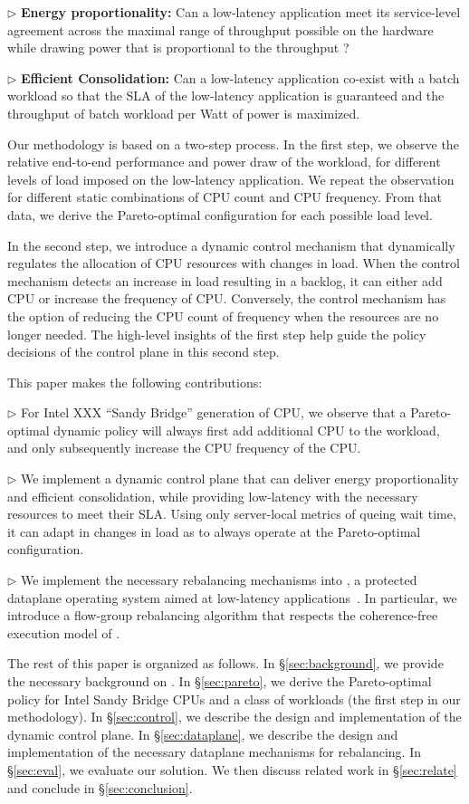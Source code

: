 $\triangleright$ {\bf Energy proportionality:} Can a low-latency
application meet its service-level agreement across the maximal range
of throughput possible on the hardware while drawing power that is
proportional to the throughput ? 

$\triangleright$ {\bf Efficient Consolidation:} Can a low-latency application
co-exist with a batch workload so that the SLA of the low-latency
application is guaranteed and the throughput of batch workload per
Watt of power is maximized.

Our methodology is based on a two-step process.  In the first step, we
observe the relative end-to-end performance and power draw of the
workload, for different levels of load imposed on the low-latency
application.  We repeat the observation for different static
combinations of CPU count and CPU frequency.  From that data, we
derive the Pareto-optimal configuration for each possible load level.

In the second step, we introduce a dynamic control mechanism that
dynamically regulates the allocation of CPU resources with changes in
load.  When the control mechanism detects an increase in load
resulting in a backlog, it can either add CPU or increase the
frequency of CPU.  Conversely, the control mechanism has the option of
reducing the CPU count of frequency when the resources are no longer
needed.  The high-level insights of the first step help guide the
policy decisions of the control plane in this second step.

This paper makes the following contributions:

$\triangleright$ For Intel XXX ``Sandy Bridge'' generation of CPU, we
observe that a Pareto-optimal dynamic policy will always first add
additional CPU to the workload, and only subsequently increase the CPU
frequency of the CPU.

$\triangleright$ We implement a dynamic control plane that can deliver
energy proportionality and efficient consolidation, while providing low-latency
with the necessary resources to meet their SLA.  Using only
server-local metrics of queing wait time, it can adapt in changes in
load as to always operate at the Pareto-optimal configuration.

$\triangleright$ We implement the necessary rebalancing mechanisms
into \ix, a protected dataplane operating system aimed at low-latency
applications~\cite{ix-osdi}.  In particular, we introduce a flow-group
rebalancing algorithm that respects the coherence-free execution model
of \ix. 

The rest of this paper is organized as follows.  In
\S\ref{sec:background}, we provide the necessary background on \ix.
In \S\ref{sec:pareto}, we derive the Pareto-optimal policy for Intel
Sandy Bridge CPUs and a class of workloads (the first step in our
methodology).  In \S\ref{sec:control}, we describe the design and
implementation of the dynamic control plane.  In
\S\ref{sec:dataplane}, we describe the design and implementation of
the necessary dataplane mechanisms for rebalancing.  In
\S\ref{sec:eval}, we evaluate our solution.  We then discuss related
work in \S\ref{sec:relate} and conclude in \S\ref{sec:conclusion}.




